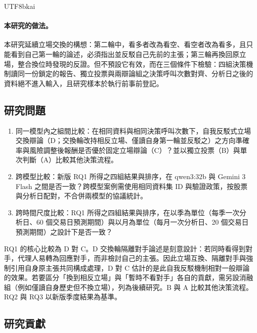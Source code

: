 \documentclass[12pt,a4paper]{article}
\newcommand{\grp}[1]{\textsf{#1}}
\begin{document}
\begin{CJK}{UTF8}{bkai}
\paragraph{本研究的做法。}
本研究延續立場交換的構想：第二輪中，看多者改為看空、看空者改為看多，且只能看到自己第一輪的論述，必須指出並反駁自己先前的主張；第三輪再換回原立場，整合換位時發現的反證。但不預設它有效，而在三個條件下檢驗：四組決策機制讀同一份鎖定的報告、獨立投票與兩辯論組之決策呼叫次數對齊、分析日之後的資料絕不進入輸入，且研究樣本於執行前事前登記。

\subsection{研究問題}

\begin{enumerate}[label=RQ\arabic*：,leftmargin=4em]
  \item 同一模型內之組間比較：在相同資料與相同決策呼叫次數下，自我反駁式立場交換辯論（\grp{D}；交換輪改持相反立場、僅讀自身第一輪並反駁之）之方向準確率與風險調整後報酬是否優於固定立場辯論（\grp{C}）？並以獨立投票（\grp{B}）與單次判斷（\grp{A}）比較其他決策流程。
  \item 跨模型比較：新版 RQ1 所得之四組結果與排序，在 qwen3:32b 與 Gemini 3 Flash 之間是否一致？跨模型案例需使用相同資料集 ID 與驗證政策，按股票與分析日配對，不合併兩模型的協議統計。
  \item 跨時間尺度比較：RQ1 所得之四組結果與排序，在以季為單位（每季一次分析日、60 個交易日預測期間）與以月為單位（每月一次分析日、20 個交易日預測期間）之設計下是否一致？
\end{enumerate}

\noindent RQ1 的核心比較為 \grp{D} 對 \grp{C}。\grp{D} 交換輪隔離對手論述是刻意設計：若同時看得到對手，代理人易轉為回應對手，而非檢討自己的主張。因此立場互換、隔離對手與強制引用自身原主張共同構成處理，\grp{D} 對 \grp{C} 估計的是此自我反駁機制相對一般辯論的效果。若要區分「換到相反立場」與「暫時不看對手」各自的貢獻，需另設消融組（例如僅讀自身歷史但不換立場），列為後續研究。\grp{B} 與 \grp{A} 比較其他決策流程。RQ2 與 RQ3 以新版季度結果為基準。

\subsection{研究貢獻}


\end{CJK}
\end{document}
